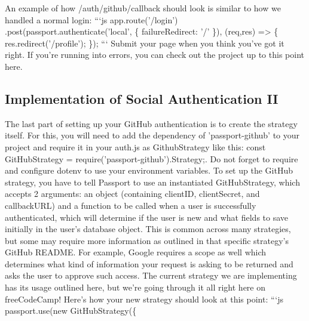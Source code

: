 \documentclass{article}%
\begin{document}
An example of how /auth/github/callback should look is similar to how we handled a normal login:\newline%
```js\newline%
app.route('/login')\newline%
  .post(passport.authenticate('local', \{ failureRedirect: '/' \}), (req,res) => \{\newline%
    res.redirect('/profile');\newline%
  \});\newline%
```\newline%
Submit your page when you think you've got it right. If you're running into errors, you can check out the project up to this point here.\newline%

%
\subsection{Implementation of Social Authentication II}%
\label{subsec:ImplementationofSocialAuthenticationII}%
The last part of setting up your GitHub authentication is to create the strategy itself. For this, you will need to add the dependency of 'passport{-}github' to your project and require it in your auth.js as GithubStrategy like this: const GitHubStrategy = require('passport{-}github').Strategy;. Do not forget to require and configure dotenv to use your environment variables.\newline%
To set up the GitHub strategy, you have to tell Passport to use an instantiated GitHubStrategy, which accepts 2 arguments: an object (containing clientID, clientSecret, and callbackURL) and a function to be called when a user is successfully authenticated, which will determine if the user is new and what fields to save initially in the user's database object. This is common across many strategies, but some may require more information as outlined in that specific strategy's GitHub README. For example, Google requires a scope as well which determines what kind of information your request is asking to be returned and asks the user to approve such access. The current strategy we are implementing has its usage outlined here, but we're going through it all right here on freeCodeCamp!\newline%
Here's how your new strategy should look at this point:\newline%
```js\newline%
passport.use(new GitHubStrategy(\{\newline%
\end{document}
